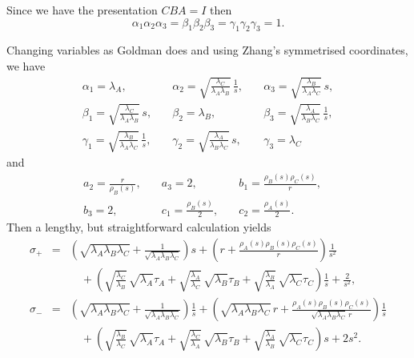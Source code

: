 \documentclass[11pt]{amsart}
\numberwithin{equation}{section}
\begin{document}
Since we have the presentation $CBA=I$ then 
$$
\alpha_1\alpha_2\alpha_3=\beta_1\beta_2\beta_3=\gamma_1\gamma_2\gamma_3=1.
$$  

Changing variables as Goldman does and using Zhang's symmetrised coordinates, we have 
$$
\begin{array}{lll}
\alpha_1=\lambda_A, \quad & 
\displaystyle{\alpha_2=\sqrt{\frac{\lambda_C}{\lambda_A\lambda_B}}\,\frac{1}{s},}\quad &
\displaystyle{\alpha_3=\sqrt{\frac{\lambda_B}{\lambda_A\lambda_C}}\,s, }\\
\displaystyle{\beta_1=\sqrt{\frac{\lambda_C}{\lambda_A\lambda_B}}\,s, }\quad & 
\beta_2=\lambda_B, \quad & 
\displaystyle{\beta_3=\sqrt{\frac{\lambda_A}{\lambda_B\lambda_C}}\,\frac{1}{s},}\\
\displaystyle{\gamma_1=\sqrt{\frac{\lambda_B}{\lambda_A\lambda_C}}\,\frac{1}{s},}\quad &
\displaystyle{\gamma_2=\sqrt{\frac{\lambda_A}{\lambda_B\lambda_C}}\,s,}\quad &
\gamma_3=\lambda_C
\end{array}
$$
and
$$
\begin{array}{lll}
\displaystyle{ a_2 = \frac{r}{\rho_B(s)},}\quad &
a_3=2,\quad &
\displaystyle{ b_1 =\frac{\rho_B(s)\rho_C(s)}{r},} \quad \\
b_3 = 2, \quad & 
\displaystyle{c_1=\frac{\rho_B(s)}{2}}, \quad &
\displaystyle{c_2=\frac{\rho_A(s)}{2}}.
\end{array}
$$
Then a lengthy, but straightforward calculation yields
\begin{eqnarray*}
\sigma_+ & = &  \left(\sqrt{\lambda_A\lambda_B\lambda_C}+\frac{1}{\sqrt{\lambda_A\lambda_B\lambda_C}}\right)s 
+\left(r+\frac{\rho_A(s)\rho_B(s)\rho_C(s)}{r}\right)\frac{1}{s^2} \\
&&\quad +\left(\sqrt{\frac{\lambda_C}{\lambda_B}}\,\sqrt{\lambda_A}\tau_A
+\sqrt{\frac{\lambda_A}{\lambda_C}}\,\sqrt{\lambda_B}\tau_B
+\sqrt{\frac{\lambda_B}{\lambda_A}}\,\sqrt{\lambda_C}\tau_C\right)\frac{1}{s}+\frac{2}{s^2}, \\
\sigma_- & = & \left(\sqrt{\lambda_A\lambda_B\lambda_C}+\frac{1}{\sqrt{\lambda_A\lambda_B\lambda_C}}\right)\frac{1}{s}
+\left(\sqrt{\lambda_A\lambda_B\lambda_C}\, r+\frac{\rho_A(s)\rho_B(s)\rho_C(s)}
{\sqrt{\lambda_A\lambda_B\lambda_C}\,r}\right)\frac{1}{s} \\
&& \quad +\left(\sqrt{\frac{\lambda_B}{\lambda_C}}\,\sqrt{\lambda_A}\tau_A 
+\sqrt{\frac{\lambda_C}{\lambda_A}}\,\sqrt{\lambda_B}\tau_B 
+\sqrt{\frac{\lambda_A}{\lambda_B}}\,\sqrt{\lambda_C}\tau_C\right) s + 2s^2. %
\end{eqnarray*}
\end{document}
